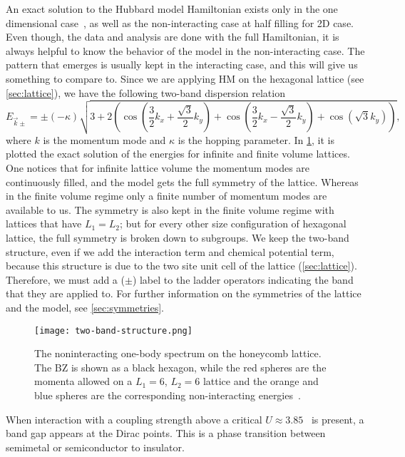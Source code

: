 An exact solution to the Hubbard model Hamiltonian exists only in the one dimensional case~\cite{hubexact}, as well as the non-interacting case at half filling for 2D case. Even though, the data and analysis are done with the full Hamiltonian, it is always helpful to know the behavior of the model in the non-interacting case. The pattern that emerges is usually kept in the interacting case, and this will give us something to compare to. Since we are applying HM on the hexagonal lattice (see \cref{sec:lattice}), we have the following two-band dispersion relation
\begin{equation}
    E_{\vec{k}\pm} = \pm (-\kappa) \sqrt{3 + 2 \left( \cos\left( \frac{3}{2}k_x + \frac{\sqrt{3}}{2}k_y \right) + \cos\left( \frac{3}{2}k_x - \frac{\sqrt{3}}{2}k_y \right) + \cos\left( \sqrt{3}k_y \right) \right)},
\end{equation}
where $k$ is the momentum mode and $\kappa$ is the hopping parameter. In \cref{fig:two-band}, it is plotted the exact solution of the energies for infinite and finite volume lattices. One notices that for infinite lattice volume the momentum modes are continuously filled, and the model gets the full symmetry of the lattice. Whereas in the finite volume regime only a finite number of momentum modes are available to us. The symmetry is also kept in the finite volume regime with lattices that have $L_1 = L_2$; but for every other size configuration of hexagonal lattice, the full symmetry is broken down to subgroups. We keep the two-band structure, even if we add the interaction term and chemical potential term, because this structure is due to the two site unit cell of the lattice (\ref{sec:lattice}). Therefore, we must add a ($\pm$) label to the ladder operators indicating the band that they are applied to. For further information on the symmetries of the lattice and the model, see \cref{sec:symmetries}.
\begin{figure}[htbp]
    \centerline{\texttt{[image: two-band-structure.png]}}
    \caption{The noninteracting one-body spectrum on the honeycomb lattice. The BZ is shown as a black hexagon, while the red spheres are the momenta allowed on a $L_1 = 6$, $L_2 = 6$ lattice and the orange and blue spheres are the corresponding non-interacting energies~\cite{evan}.}
    \label{fig:two-band}
\end{figure}
When interaction with a coupling strength above a critical $U\approx3.85$~\cite{mott} is present, a band gap appears at the Dirac points. This is a phase transition between semimetal or semiconductor to insulator.

